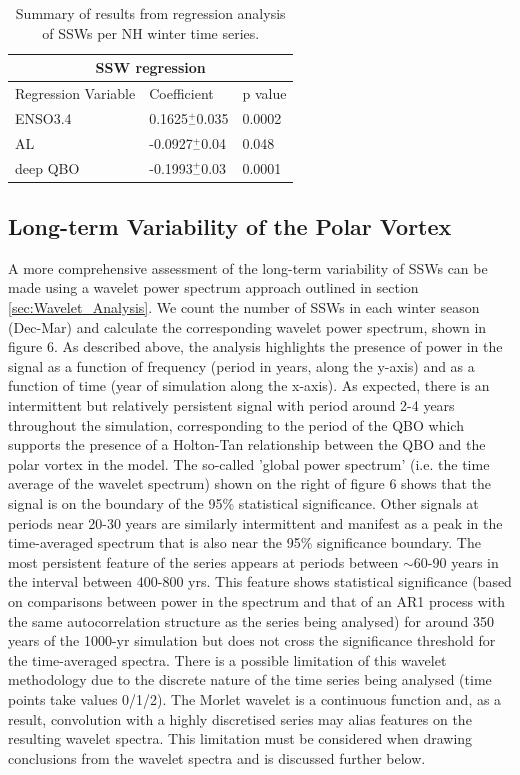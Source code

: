 \begin{table}[h!]
\centering
\begin{tabular}{|p{3cm}||p{3cm}|p{3cm}|}
 \hline
 \multicolumn{3}{|c|}{SSW regression}\\
 \hline
 Regression Variable& Coefficient& p value\\
 \hline
 ENSO3.4  & 0.1625$^+_-$0.035& 0.0002\\
 AL  &   -0.0927$^+_-$0.04  & 0.048\\
 deep QBO  & -0.1993$^+_-$0.03&0.0001\\
 \hline
 \end{tabular}
\begin{center}
\caption{Summary of results from regression analysis of SSWs per NH winter time series.}
\label{table:regression_SSW}
\end{center}
\end{table}


\subsection{Long-term Variability of the Polar Vortex}
A more comprehensive assessment of the long-term variability of SSWs can be made using a wavelet power spectrum approach outlined in section \ref{sec:Wavelet_Analysis}. We count the number of SSWs in each winter season (Dec-Mar) and calculate the corresponding wavelet power spectrum, shown in figure 6. As described above, the analysis highlights the presence of power in the signal as a function of frequency (period in years, along the y-axis) and as a function of time (year of simulation along the x-axis). As expected, there is an intermittent but relatively persistent signal with period around 2-4 years throughout the simulation, corresponding to the period of the QBO which supports the presence of a Holton-Tan relationship between the QBO and the polar vortex in the model. The so-called 'global power spectrum' (i.e. the time average of the wavelet spectrum) shown on the right of figure 6 shows that the signal is on the boundary of the 95\% statistical significance. Other signals at periods near 20-30 years are similarly intermittent and manifest as a peak in the time-averaged spectrum that is also near the 95\% significance boundary. The most persistent feature of the series appears at periods between $\sim$60-90 years in the interval between 400-800 yrs. This feature shows statistical significance (based on comparisons between power in the spectrum and that of an AR1 process with the same autocorrelation structure as the series being analysed) for around 350 years of the 1000-yr simulation but does not cross the significance threshold for the time-averaged spectra. There is a possible limitation of this wavelet methodology due to the discrete nature of the time series being analysed (time points take values 0/1/2). The Morlet wavelet is a continuous function and, as a result, convolution with a highly discretised series may alias features on the resulting wavelet spectra. This limitation must be considered when drawing conclusions from the wavelet spectra and is discussed further below.


